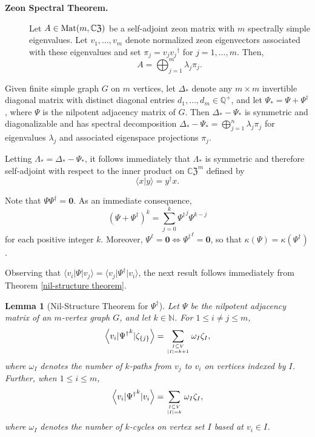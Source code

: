 \documentclass{article}
\newtheorem{lemma}[theorem]{Lemma}
\theoremstyle{definition}
\newcommand{\CZ}{\mathbb{C}\mathfrak{Z}}
\newcommand{\Mat}{{\rm Mat}}
\newcommand{\zm}{\mathbf{0}}
\numberwithin{equation}{section}
\begin{document}
\begin{description}
\item [{\bf Zeon Spectral Theorem.}]
Let $A\in\Mat(m,\CZ)$ be a self-adjoint zeon matrix with $m$ spectrally simple eigenvalues.  Let $v_1, \ldots, v_m$ denote normalized zeon eigenvectors associated with these eigenvalues and set $\pi_j=v_j{v_j}^\dag$ for $j=1, \ldots, m$.  Then, \begin{equation*}
A=\bigoplus_{j=1}^m \lambda_j\pi_j.
\end{equation*}
\end{description}

Given finite simple graph $G$ on $m$ vertices, let $\Delta_*$ denote any $m\times m$ invertible diagonal matrix with distinct diagonal entries $d_1, \ldots, d_m\in\mathbb{Q}^+$, and let $\Psi_*=\Psi+\Psi^\dag$, where $\Psi$ is the nilpotent adjacency matrix of $G$.  Then $\Delta_*-\Psi_*$ is symmetric and diagonalizable and has spectral decomposition $\Delta_*-\Psi_*=\displaystyle\bigoplus_{j=1}^n\lambda_j\pi_j$ for eigenvalues $\lambda_j$ and associated eigenspace projections $\pi_j$.

Letting $\Lambda_*=\Delta_*-\Psi_*$, it follows immediately that $\Lambda_*$ is symmetric and therefore self-adjoint with respect to the inner product on ${\CZ}^m$ defined by 
\begin{equation*}
\langle x\vert y\rangle =y^\dag x.
\end{equation*}

Note that $\Psi\Psi^\dag=\zm$.  As an immediate consequence, \begin{equation*}
(\Psi+\Psi^\dag)^k=\sum_{j=0}^k {\Psi^\dag}^j\Psi^{k-j}
\end{equation*}
for each positive integer $k$.  Moreover, $\Psi^\ell=\zm\Leftrightarrow {\Psi^\dag}^\ell=\zm$, so that $\kappa(\Psi)=\kappa(\Psi^\dag)$.

Observing that $\langle v_i\vert \Psi\vert v_j\rangle=\langle v_j\vert \Psi^\dag\vert v_i\rangle$, the next result follows immediately from Theorem \ref{nil-structure theorem}. 

\begin{lemma} [Nil-Structure Theorem for $\Psi^\dag$]
Let $\Psi$ be the nilpotent adjacency matrix of an
$m$-vertex graph $G$, and let $k\in\mathbb{N}$.  For $1\le i\ne j \le m$, 
\begin{equation*}
\left<v_i\vert{\Psi^\dag}^k\vert \zeta_{\{j\}}\right>=
\sum_{\genfrac{}{}{0pt}{}{I\subseteq V}{|I|=k+1}}\omega_I \zeta_{I},\end{equation*}
where $\omega_I$ denotes the number of $k$-paths from $v_j$ to $v_i$ on vertices indexed by $I$.  Further,  when $1\le i \le m$,
\begin{equation*}
\left<v_i\vert{\Psi^\dag}^k\vert v_i\right>=\sum_{\genfrac{}{}{0pt}{}{I\subseteq V}{|I|=k}}\omega_I \zeta_{I},\end{equation*}
where $\omega_I$ denotes the number of $k$-cycles on vertex set $I$ based at $v_i\in I$.  
\end{lemma}
\end{document}
